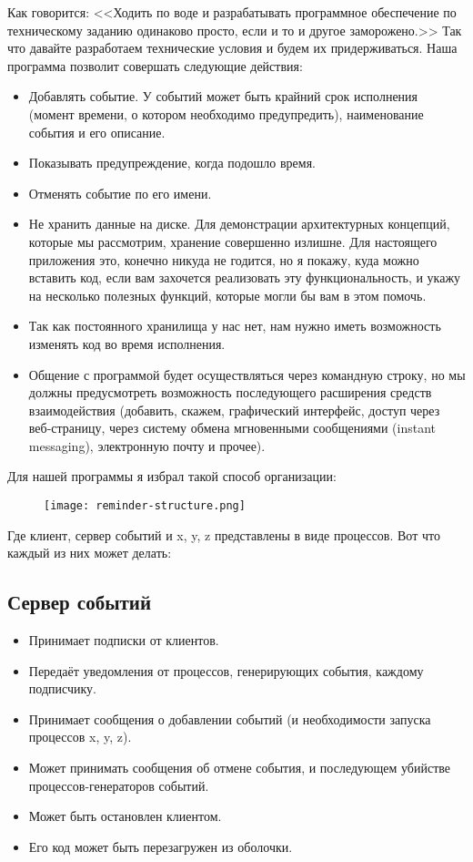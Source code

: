 Как говорится: <<Ходить по воде и разрабатывать программное обеспечение по техническому заданию одинаково просто, если и то и другое заморожено.>>
Так что давайте разработаем технические условия и будем их придерживаться.
Наша программа позволит совершать следующие действия:
\begin{itemize}
\item Добавлять событие.
У событий может быть крайний срок исполнения (момент времени, о котором необходимо предупредить), наименование события и его описание.
\item Показывать предупреждение, когда подошло время.
\item Отменять событие по его имени.
\item Не хранить данные на диске.
    Для демонстрации архитектурных концепций, которые мы рассмотрим, хранение совершенно излишне.
Для настоящего приложения это, конечно никуда не годится, но я покажу, куда можно вставить код, если вам захочется реализовать эту функциональность, и укажу на несколько полезных функций, которые могли бы вам в этом помочь.
\item Так как постоянного хранилища у нас нет, нам нужно иметь возможность изменять код во время исполнения.
\item Общение с программой будет осуществляться через командную строку, но мы должны предусмотреть возможность последующего расширения  средств взаимодействия (добавить, скажем, графический интерфейс, доступ через веб\--страницу, через систему обмена мгновенными сообщениями (instant messaging), электронную почту и прочее).
\end{itemize}

Для нашей программы я избрал такой способ организации:
\begin{figure}[h!]
    \centering
    \texttt{[image: reminder-structure.png]}
\end{figure}

Где клиент, сервер событий и x, y, z представлены в виде процессов.
Вот что каждый из них может делать:
\subsection{Сервер событий}
\label{event-server}
\begin{itemize}
\item Принимает подписки от клиентов.
\item Передаёт уведомления от процессов, генерирующих события, каждому подписчику.
\item Принимает сообщения о добавлении событий (и необходимости запуска процессов x, y, z).
\item Может принимать сообщения об отмене события, и последующем убийстве процессов\--генераторов событий.
\item Может быть остановлен клиентом.
\item Его код может быть перезагружен из оболочки.
\end{itemize}
